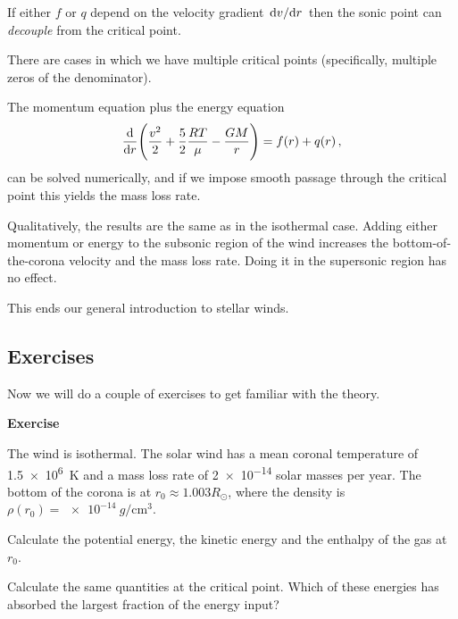 \documentclass[main.tex]{subfiles}
\begin{document}
If either \(f\) or \(q\) depend on the velocity gradient \(\dv*{v}{r}\) then the sonic point can \emph{decouple} from the critical point.

There are cases in which we have multiple critical points (specifically, multiple zeros of the denominator).

The momentum equation plus the energy equation 
%
\begin{align}
  \dv{}{r} \qty(\frac{v^2}{2} + \frac{5}{2} \frac{RT}{\mu } - \frac{GM}{r}) = f(r) + q(r)
\,,
\end{align}
%
can be solved numerically, and if we impose smooth passage through the critical point this yields the mass loss rate.

Qualitatively, the results are the same as in the isothermal case.
Adding either momentum or energy to the subsonic region of the wind increases the bottom-of-the-corona velocity and the mass loss rate. Doing it in the supersonic region has no effect.

This ends our general introduction to stellar winds.

\subsection{Exercises}

Now we will do a couple of exercises to get familiar with the theory. 

\begin{greenbox} \textbf{Exercise}

The wind is isothermal.
The solar wind has a mean coronal temperature of \SI{1.5e6}{K} and a mass loss rate of \num{2e-14} solar masses per year.
The bottom of the corona is at \(r_0 \approx 1.003 R_{\odot}\), where the density is \(\rho (r_0 ) = \SI{e-14}{g\per\centi\metre\cubed}\).

Calculate the potential energy, the kinetic energy and the enthalpy of the gas at \(r_0 \).

Calculate the same quantities at the critical point. Which of these energies has absorbed the largest fraction of the energy input?
\end{greenbox}
\end{document}
